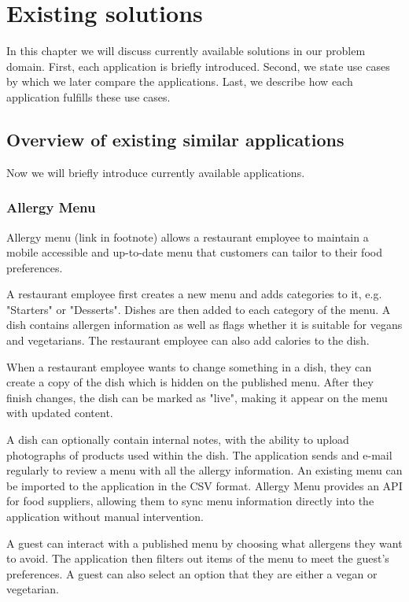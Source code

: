 \chapter{Existing solutions}
In this chapter we will discuss currently available solutions in our problem domain.
First, each application is briefly introduced.
Second, we state use cases by which we later compare the applications.
Last, we describe how each application fulfills these use cases.

\section{Overview of existing similar applications}
Now we will briefly introduce currently available applications.


\subsection*{Allergy Menu}
  Allergy menu (link in footnote) allows a restaurant employee to maintain a mobile accessible and up-to-date menu that customers can tailor to their food preferences.
  
  A restaurant employee first creates a new menu and adds categories to it, e.g. "Starters" or "Desserts".
  Dishes are then added to each category of the menu.
  A dish contains allergen information as well as flags whether it is suitable for vegans and vegetarians.
  The restaurant employee can also add calories to the dish.

  When a restaurant employee wants to change something in a dish, they can create a copy of the dish which is hidden on the published menu.
  After they finish changes, the dish can be marked as "live", making it appear on the menu with updated content. 

  A dish can optionally contain internal notes, with the ability to upload photographs of products used within the dish.
  The application sends and e-mail regularly to review a menu with all the allergy information.
  An existing menu can be imported to the application in the CSV format.
  Allergy Menu provides an API for food suppliers, allowing them to sync menu information directly into the application without manual intervention.
  
  A guest can interact with a published menu by choosing what allergens they want to avoid.
  The application then filters out items of the menu to meet the guest's preferences.
  A guest can also select an option that they are either a vegan or vegetarian.
  
